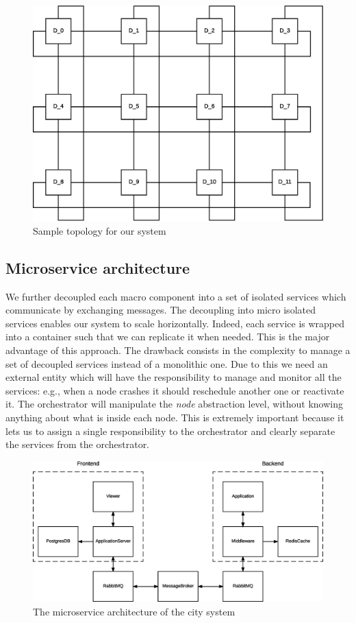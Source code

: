 \begin{figure}[H]
  \centering
  \includegraphics[scale=0.5,keepaspectratio]
    {images/solution/topology.eps}
  \caption{Sample topology for our system}
  \label{fig:sd-sys-arch-topology}
\end{figure}


\subsection{Microservice architecture}

We further decoupled each macro component into a set of isolated services
which communicate by exchanging messages. The decoupling into micro isolated
services enables our system to scale horizontally. Indeed, each service is wrapped
into a container such that we can replicate it when needed. This is the major advantage
of this approach. The drawback consists in the complexity to manage a set of decoupled
services instead of a monolithic one. Due to this we need an external entity which
will have the responsibility to manage and monitor all the services: e.g., when a node crashes it should reschedule another one or reactivate it. The orchestrator will
manipulate the \textit{node} abstraction level, without knowing anything about what is inside each node. This is extremely important because it lets us to assign
a single responsibility to the orchestrator and clearly separate the services from
the orchestrator.

\begin{figure}[H]
  \centering
  \includegraphics[scale=0.5,keepaspectratio]
    {images/solution/microservices.eps}
  \caption{The microservice architecture of the city system}
  \label{fig:sd-sys-arch-micro}
\end{figure}
